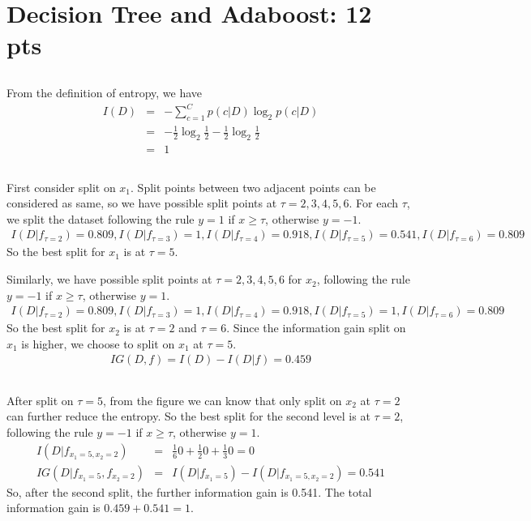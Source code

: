 \documentclass[12pt]{article}
\begin{document}
\newpage

\section{Decision Tree and Adaboost: 12 pts}
\subsection{}
From the definition of entropy, we have
\begin{eqnarray}
    I(D) &=& -\sum_{c=1}^C p(c|D)\log_2p(c|D) \nonumber \\
    &=& -\frac{1}{2}\log_2\frac{1}{2} - \frac{1}{2}\log_2\frac{1}{2} \nonumber \\
    &=& 1 \nonumber
\end{eqnarray}

\subsection{}
First consider split on $x_1$. Split points between two adjacent points can be considered as same, so we have possible split points at $\tau = 2, 3, 4, 5, 6$. 
For each $\tau$, we split the dataset following the rule $y = 1$ if $x \ge \tau$, otherwise $y = -1$.
\begin{eqnarray}
    I(D|f_{\tau=2}) = 0.809, I(D|f_{\tau=3}) = 1, I(D|f_{\tau=4}) = 0.918, I(D|f_{\tau=5}) = 0.541, I(D|f_{\tau=6}) = 0.809 \nonumber
\end{eqnarray}
So the best split for $x_1$ is at $\tau = 5$.

Similarly, we have possible split points at $\tau = 2, 3, 4, 5, 6$ for $x_2$, following the rule $y = -1$ if $x \ge \tau$, otherwise $y = 1$.
\begin{eqnarray}
    I(D|f_{\tau=2}) = 0.809, I(D|f_{\tau=3}) = 1, I(D|f_{\tau=4}) = 0.918, I(D|f_{\tau=5}) = 1, I(D|f_{\tau=6}) = 0.809 \nonumber
\end{eqnarray}
So the best split for $x_2$ is at $\tau = 2$ and $\tau = 6$. Since the information gain split on $x_1$ is higher, we choose to split on $x_1$ at $\tau = 5$.
\begin{eqnarray}
    IG(D, f) = I(D) - I(D|f) = 0.459 \nonumber
\end{eqnarray}

\subsection{}
After split on $\tau = 5$, from the figure we can know that only split on $x_2$ at $\tau = 2$ can further reduce the entropy. So the best split for the second level is at $\tau = 2$, following the rule $y = -1$ if $x \ge \tau$, otherwise $y = 1$.
\begin{eqnarray}
    I(D|f_{x_1=5, x_2=2}) &=& \frac{1}{6}0 + \frac{1}{2}0 + \frac{1}{3}0 = 0 \nonumber\\
    IG(D|f_{x_1=5}, f_{x_2=2}) &=& I(D|f_{x_1=5}) - I(D|f_{x_1=5, x_2=2}) = 0.541 \nonumber 
\end{eqnarray}
So, after the second split, the further information gain is 0.541. The total information gain is $ 0.459 + 0.541 = 1$.
\end{document}
